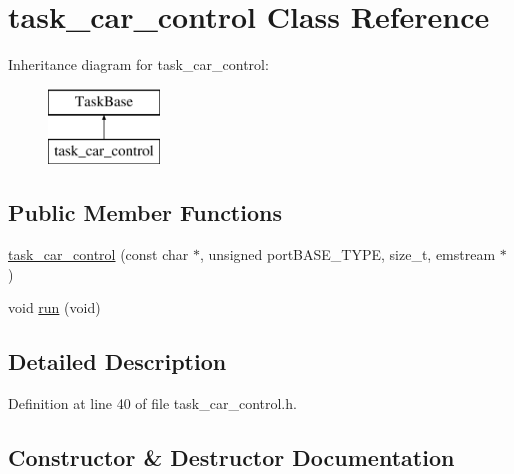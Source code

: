 \hypertarget{classtask__car__control}{}\section{task\+\_\+car\+\_\+control Class Reference}
\label{classtask__car__control}
Inheritance diagram for task\+\_\+car\+\_\+control\+:\begin{figure}[H]
\begin{center}
\leavevmode
\includegraphics[height=2.000000cm]{classtask__car__control}
\end{center}
\end{figure}
\subsection*{Public Member Functions}
\begin{DoxyCompactItemize}
\item 
\mbox{\hyperlink{classtask__car__control_ae42d6364ed49d5d59a5d3dbebc8a7f38}{task\+\_\+car\+\_\+control}} (const char $\ast$, unsigned port\+B\+A\+S\+E\+\_\+\+T\+Y\+PE, size\+\_\+t, emstream $\ast$)
\item 
void \mbox{\hyperlink{classtask__car__control_a797dbdeb270271b48c468442d3ab91bd}{run}} (void)
\end{DoxyCompactItemize}


\subsection{Detailed Description}


Definition at line 40 of file task\+\_\+car\+\_\+control.\+h.



\subsection{Constructor \& Destructor Documentation}
\mbox{\label{classtask__car__control_ae42d6364ed49d5d59a5d3dbebc8a7f38}} 
